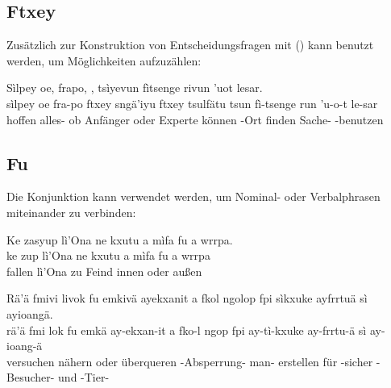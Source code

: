 \subsection{Ftxey} Zusätzlich zur Konstruktion von Entscheidungsfragen mit  () kann  benutzt werden, um Möglichkeiten aufzuzählen: 

\begin{interlin}
	\glll \Npawl{}Sìlpey oe, frapo,    , tsìyevun fìtsenge rivun 'uot lesar. \\
	sìlpey oe fra-po ftxey sngä'iyu ftxey tsulfätu tsun fì-tsenge run 'u-o-t le-sar \\
		hoffen  alles- ob Anfänger oder Experte können -Ort finden Sache- -benutzen \\
\end{interlin}

\subsection{Fu} Die Konjunktion   kann verwendet werden, um Nominal- oder Verbalphrasen miteinander zu verbinden:

\begin{interlin}
	\glll \Npawl{}Ke zasyup lì'Ona ne kxutu a mìfa fu a wrrpa. \\
	ke zup lì'Ona ne kxutu a mìfa fu a wrrpa \\
	 fallen lì'Ona zu Feind  innen oder  außen\\
\end{interlin}

\begin{interlin}
	\glll \Npawl{}Rä'ä fmivi livok fu emkivä ayekxanit a fkol ngolop fpi sìkxuke ayfrrtuä sì ayioangä. \\
	rä'ä fmi lok fu emkä ay-ekxan-it a fko-l ngop fpi ay-tì-kxuke ay-frrtu-ä sì ay-ioang-ä \\
	 versuchen nähern oder überqueren -Absperrung-  man- erstellen für -sicher -Besucher- und -Tier- \\
\end{interlin}

